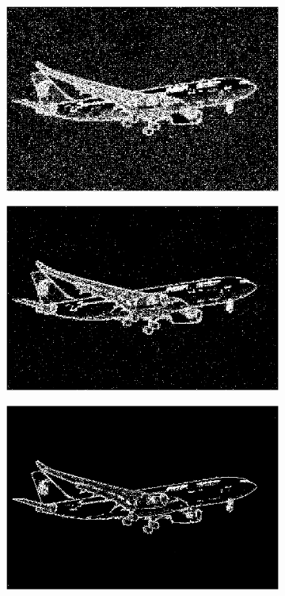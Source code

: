 \documentclass[12pt,a4paper]{report}
\begin{document}
\begin{figure}[!htb]
  \centering
  \begin{subfigure}{0.49\linewidth}
    \includegraphics[width=1\linewidth]{output/aeroplane_Q4_t_16.png}
  \end{subfigure}
  \begin{subfigure}{0.49\linewidth}
    \includegraphics[width=1\linewidth]{output/aeroplane_Q4_t_32.png}
  \end{subfigure}
  \begin{subfigure}{0.49\linewidth}
    \includegraphics[width=1\linewidth]{output/aeroplane_Q4_t_64.png}

\end{subfigure}
\end{figure}
\end{document}
